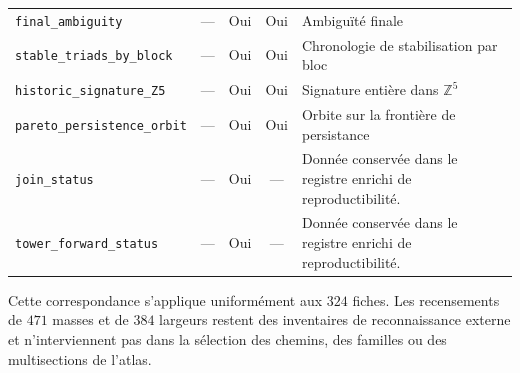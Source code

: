 \begin{longtable}{p{}ccc p{}}
\nolinkurl{final_ambiguity} & --- & Oui & Oui & Ambiguïté finale \\
\nolinkurl{stable_triads_by_block} & --- & Oui & Oui & Chronologie de stabilisation par bloc \\
\nolinkurl{historic_signature_Z5} & --- & Oui & Oui & Signature entière dans \(\mathbb Z^5\) \\
\nolinkurl{pareto_persistence_orbit} & --- & Oui & Oui & Orbite sur la frontière de persistance \\
\nolinkurl{join_status} & --- & Oui & --- & Donnée conservée dans le registre enrichi de reproductibilité. \\
\nolinkurl{tower_forward_status} & --- & Oui & --- & Donnée conservée dans le registre enrichi de reproductibilité. \\
\hline
\end{longtable}
\endgroup

Cette correspondance s'applique uniformément aux \(324\) fiches. Les
recensements de \(471\) masses et de \(384\) largeurs restent des inventaires de
reconnaissance externe et n'interviennent pas dans la sélection des chemins, des familles
ou des multisections de l'atlas.
